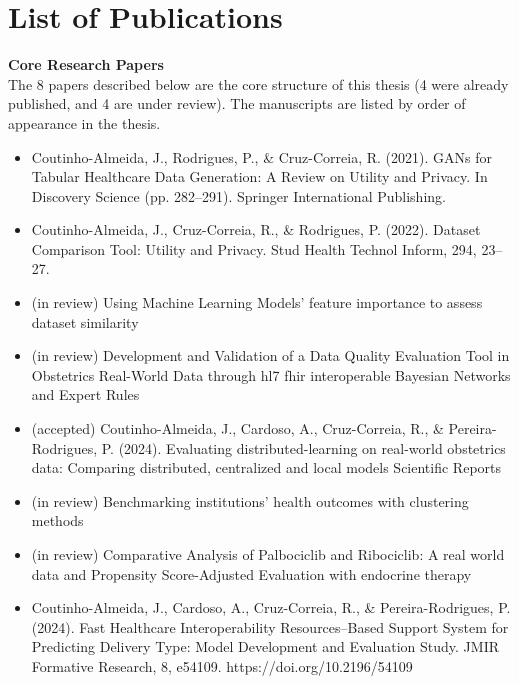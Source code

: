 \chapter*{List of Publications}



\textbf{Core Research Papers} \\
The 8 papers described below are the core structure of this thesis (4 were already published, and 4 are under review). The manuscripts are listed by order of appearance in the thesis.
\\
\begin{itemize}
    \item Coutinho-Almeida, J., Rodrigues, P., \& Cruz-Correia, R. (2021). GANs for Tabular Healthcare Data Generation: A Review on Utility and Privacy. In Discovery Science (pp. 282–291). Springer International Publishing.

    \item Coutinho-Almeida, J., Cruz-Correia, R., \& Rodrigues, P. (2022). Dataset Comparison Tool: Utility and Privacy. Stud Health Technol Inform, 294, 23–27.
    

    \item (in review) Using Machine Learning Models' feature importance to assess dataset similarity 


    \item  (in review) Development and Validation of a Data Quality Evaluation Tool in Obstetrics Real-World Data through \ac{hl7} \ac{fhir} interoperable Bayesian Networks and Expert Rules
    
    \item (accepted) Coutinho-Almeida, J., Cardoso, A., Cruz-Correia, R., \& Pereira-Rodrigues, P. (2024). Evaluating distributed-learning on real-world obstetrics data: Comparing distributed, centralized and local models Scientific Reports 
    
    \item (in review) Benchmarking institutions' health outcomes with clustering methods 

    
    \item (in review) Comparative Analysis of Palbociclib and Ribociclib: A real world data and Propensity Score-Adjusted Evaluation with endocrine therapy
    
    
    \item Coutinho-Almeida, J., Cardoso, A., Cruz-Correia, R., \& Pereira-Rodrigues, P. (2024). Fast Healthcare Interoperability Resources–Based Support System for Predicting Delivery Type: Model Development and Evaluation Study. JMIR Formative Research, 
    8, e54109. https://doi.org/10.2196/54109

\end{itemize}



